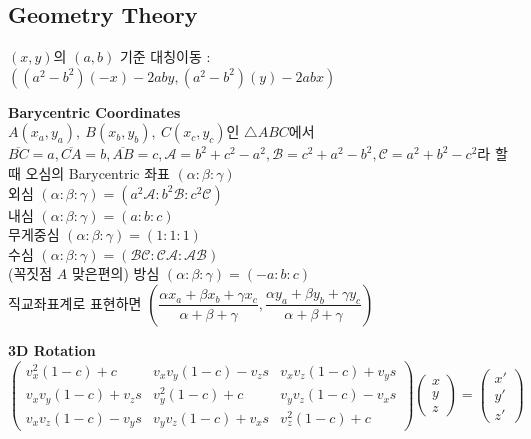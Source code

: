 \subsection{Geometry Theory}

\noindent
$(x, y)$의 $(a, b)$ 기준 대칭이동 : $((a^2 - b^2)(-x) - 2aby, (a^2 - b^2)(y) - 2abx)$

\vspace{5pt}
\noindent \textbf{Barycentric Coordinates} \\
$A(x_a, y_a), ~ B(x_b, y_b), ~ C(x_c, y_c)$인 $\triangle{ABC}$에서 \\
$\overline{BC}=a, \overline{CA}=b, \overline{AB}=c, \mathcal{A} = b^2 + c^2 - a^2, \mathcal{B} = c^2 + a^2 - b^2, \mathcal{C} = a^2 + b^2 - c^2$라 할 때 오심의 Barycentric 좌표 $(\alpha : \beta : \gamma)$ \\
외심 $(\alpha : \beta : \gamma) = (a^2 \mathcal{A} : b^2 \mathcal{B} : c^2 \mathcal{C})$ \\
내심 $(\alpha : \beta : \gamma) = (a : b : c)$ \\
무게중심 $(\alpha : \beta : \gamma) = (1 : 1 : 1)$ \\
수심 $(\alpha : \beta : \gamma) = (\mathcal{BC} : \mathcal{CA} : \mathcal{AB})$ \\
(꼭짓점 $A$ 맞은편의) 방심 $(\alpha : \beta : \gamma) = (-a : b : c)$ \\
직교좌표계로 표현하면 $\left( \dfrac{\alpha x_a + \beta x_b + \gamma x_c}{\alpha + \beta + \gamma}, \dfrac{\alpha y_a + \beta y_b + \gamma y_c}{\alpha + \beta + \gamma} \right)$

\vspace{5pt}
\noindent \textbf{3D Rotation} \\
\begingroup
\scriptsize
\setlength{\arraycolsep}{2pt}
\[
\begin{pmatrix}
v_x^2(1-c)+c & v_xv_y(1-c)-v_zs & v_xv_z(1-c)+v_ys \\
v_xv_y(1-c)+v_zs & v_y^2(1-c)+c & v_yv_z(1-c)-v_xs \\
v_xv_z(1-c)-v_ys & v_yv_z(1-c)+v_xs & v_z^2(1-c)+c
\end{pmatrix}
\begin{pmatrix}x\\y\\z\end{pmatrix}
=
\begin{pmatrix}x'\\y'\\z'\end{pmatrix}
\]
\endgroup


